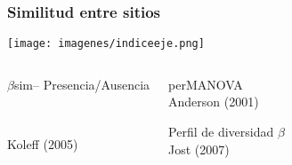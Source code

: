 \documentclass[compress]{beamer}
\begin{document}






{
\begin{frame}
\frametitle{Similitud entre sitios}

\begin{center}
\texttt{[image: imagenes/indiceeje.png]}
\end{center}
\vspace{-2cm}

\begin {columns}
\begin{itemize}
\normalsize{\item <1> $\beta$sim-- Presencia/Ausencia}\\
\normalsize{\item <2> Koleff (2005)}\\
\end{itemize}
\begin{itemize}

\normalsize{\item  <3> perMANOVA\\
Anderson (2001)}
\normalsize{\item <4> Perfil de diversidad $\beta$\\
Jost (2007)}

\end{itemize}
\end{columns}
\end{frame}
}
\end{document}
